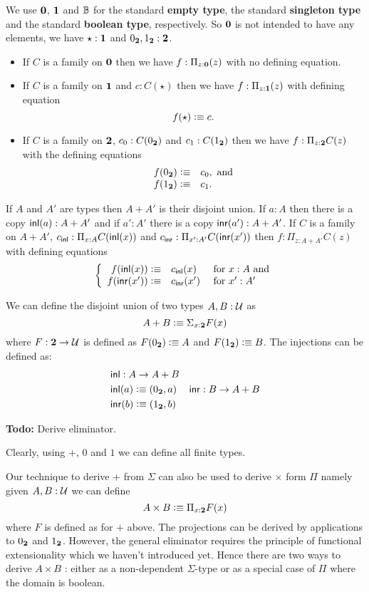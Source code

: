 {We use $\mathbf{0}$, $\mathbf{1}$ and $\mathbb{B}$ for the standard {\bf empty
  type}, the standard {\bf singleton type} and the standard {\bf
  boolean type}, respectively.  So $\mathbf{0}$ is not intended to have
any elements, we have $\star:\mathbf{1}$ and $0_\mathbf{2},1_\mathbf{2}:\mathbf{2}$.
\begin{itemize}
\item If $C$ is a family on $\mathbf{0}$ then we have $f:\Pi_{z:\mathbf{0}}(z)$ with no defining equation.
\item If $C$ is a family on $\mathbf{1}$ and $c:C(\star)$ then we have $f:\Pi_{z:\mathbf{1}}(z)$ with defining equation
  \[ f(\star)\vcentcolon\equiv c.\]
\item If $C$ is a family on $\mathbf{2}$, $c_0:C(0_\mathbf{2})$ 
and $c_1:C(1_\mathbf{2})$ then we have $f:\Pi_{z:\mathbf{2}}C(z)$ with the defining equations
 \[ \begin{array}{rl}
f(0_\mathbf{2}) \vcentcolon\equiv& c_0, \mbox{ and}\\
f(1_\mathbf{2}) \vcentcolon\equiv& c_1.
  \end{array}\]
\end{itemize}

If $A$ and $A'$ are types then $A+A'$ is their disjoint union.  If
$a:A$ then there is a copy $\mathsf{inl}(a):A+A'$ and if $a':A'$ there is a
copy $\mathsf{inr}(a'):A+A'$.
If $C$ is a family on $A+A'$, $c_\mathsf{inl}:\Pi_{x:A}C(\mathsf{inl}(x))$ and $c_\mathsf{inr}:\Pi_{x':A'}C(\mathsf{inr}(x'))$ then $f:\Pi_{z:A+A'}C(z)$ with defining equations
  \[\left\{\begin{array}{rll} 
f(\mathsf{inl}(x))\vcentcolon\equiv& c_\mathsf{inl}(x)&\mbox{ for } x:A \mbox{ and}\\
f(\mathsf{inr}(x'))\vcentcolon\equiv& c_\mathsf{inr}(x')&\mbox{ for } x':A'\\
\end{array}\right.\]

We can define the disjoint union of two types $A,B:\mathcal{U}$ as
\[A + B \vcentcolon\equiv \Sigma_{x:\mathbf{2}}F(x)\]
where $F : \mathbf{2} \to \mathcal{U}$ is
defined as $F(0_\mathbf{2}) \vcentcolon\equiv A$ and $F(1_\mathbf{2})\vcentcolon\equiv B$. The
injections can be defined as:
\begin{align*}
& \mathsf{inl} :  A \to A+B\\
& \mathsf{inl}(a) \vcentcolon\equiv (0_\mathbf{2},a)
& \mathsf{inr} :  B \to A+B\\
& \mathsf{inr}(b) \vcentcolon\equiv (1_\mathbf{2},b)
\end{align*}

\textbf{Todo:} Derive eliminator.

Clearly, using $+$, $0$ and $1$ we can define all finite types.

Our technique to derive $+$ from $\Sigma$ can also be used to derive
$\times$ form $\Pi$ namely given $A,B:\mathcal{U}$ we can define 
\[ A \times B \vcentcolon\equiv \Pi_{x:\mathbf{2}}F(x)\]
where $F$ is defined as for $+$ above. The projections can be derived
by applications to $0_\mathbf{2}$ and $1_\mathbf{2}$. However, the general
eliminator requires the principle of functional extensionality which
we haven't introduced yet. Hence there are two ways to derive $A\times
B$ : either as a non-dependent $\Sigma$-type or as a special case of
$\Pi$ where the domain is boolean. 

}
